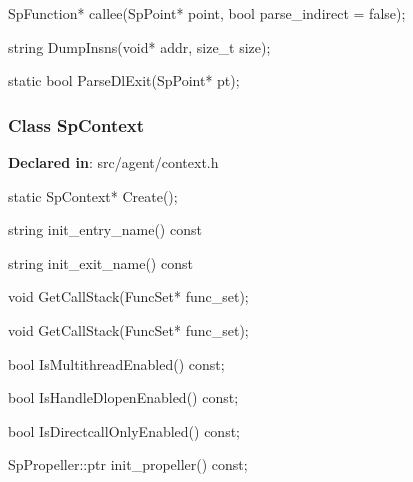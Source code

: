 \begin{apient}
SpFunction* callee(SpPoint* point, bool parse_indirect = false);
\end{apient}
\apidesc{
}

\begin{apient}
string DumpInsns(void* addr, size_t size);
\end{apient}
\apidesc{
}

\begin{apient}
static bool ParseDlExit(SpPoint* pt);
\end{apient}
\apidesc{
}

\subsubsection{Class SpContext}
\textbf{Declared in}: src/agent/context.h

\begin{apient}
static SpContext* Create();
\end{apient}
\apidesc{
}

\begin{apient}
string init_entry_name() const
\end{apient}
\apidesc{
}

\begin{apient}
string init_exit_name() const
\end{apient}
\apidesc{
}

\begin{apient}
void GetCallStack(FuncSet* func_set);
\end{apient}
\apidesc{
}

\begin{apient}
void GetCallStack(FuncSet* func_set);
\end{apient}
\apidesc{
}

\begin{apient}
bool IsMultithreadEnabled() const;
\end{apient}
\apidesc{
}

\begin{apient}
bool IsHandleDlopenEnabled() const;
\end{apient}
\apidesc{
}

\begin{apient}
bool IsDirectcallOnlyEnabled() const;
\end{apient}
\apidesc{
}

\begin{apient}
SpPropeller::ptr init_propeller() const;
\end{apient}
\apidesc{
}

